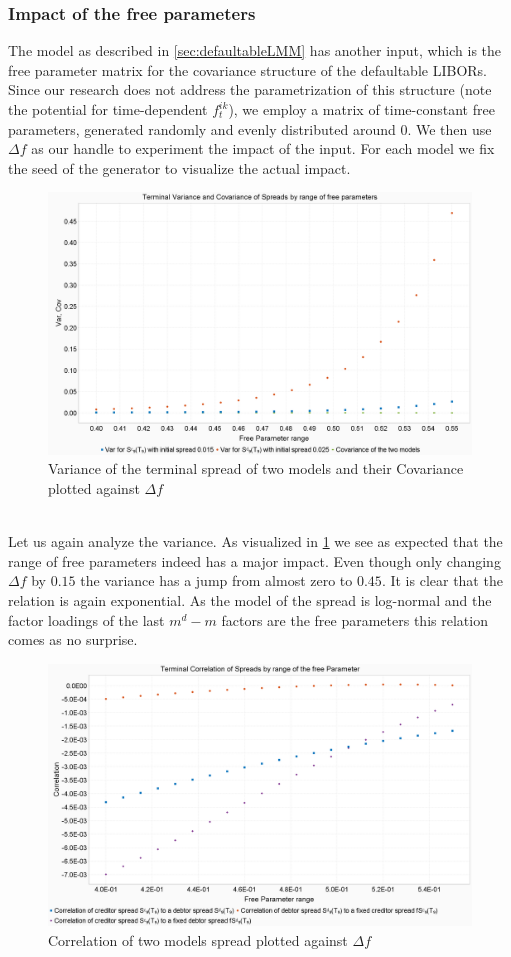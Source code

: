\documentclass[12pt]{article}
\begin{document}
	\subsubsection{Impact of the free parameters}\label{sec:impactofdeltaf}
	The model as described in \cref{sec:defaultableLMM} has another input, which is the free parameter matrix for the covariance structure of the defaultable LIBORs. 
	Since our research does not address the parametrization of this structure (note the potential for time-dependent $f^{i k}_t$), we employ a matrix of time-constant free parameters, generated randomly and evenly distributed around 0. We then use $\Delta f$ as our handle to experiment the impact of the input. For each model we fix the seed of the generator to visualize the actual impact.
	\begin{figure}[h!]
		\centering
		\includegraphics[width=0.7\linewidth]{figures/Today/SpreadVarCovByFreeParameters}
		\caption{Variance of the terminal spread of two models and their Covariance plotted against $\Delta f$}
		\label{fig:spreadvarcovbyfreeparameters}
	\end{figure}
	\\Let us again analyze the variance. As visualized in \cref{fig:spreadvarcovbyfreeparameters} we see as expected that the range of free parameters indeed has a major impact. Even though only changing $\Delta f$ by $0.15$ the variance has a jump from almost zero to $0.45$. It is clear that the relation is again exponential. As the model of the spread is log-normal and the factor loadings of the last $m^d - m$ factors are the free parameters this relation comes as no surprise.
	\begin{figure}[h!]
		\centering
		\includegraphics[width=0.7\linewidth]{figures/Today/SpreadCorrelationByFreeParameters}
		\caption{Correlation of two models spread plotted against $\Delta f$}
		\label{fig:spreadcorrelationbyfreeparameters}
	\end{figure}
\end{document}
